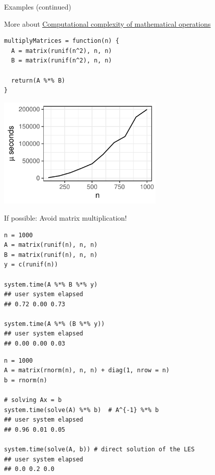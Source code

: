 \documentclass[11pt,compress,t,notes=noshow, xcolor=table]{beamer}
\begin{document}
\begin{vbframe}{Examples (continued)}
\vfill
\begin{footnotesize}
More about \href{https://en.wikipedia.org/wiki/Computational_complexity_of_mathematical_operations}{\color{blue}\underline{Computational complexity of mathematical operations}}
\end{footnotesize}

\framebreak

\begin{verbatim}
multiplyMatrices = function(n) {
  A = matrix(runif(n^2), n, n)
  B = matrix(runif(n^2), n, n)

  return(A %*% B)
}
\end{verbatim}

\vspace{-0.2cm}
\begin{center}
\includegraphics[height = 0.5\textheight, width= 0.6\textwidth]{figure_man/runtime_matmult.pdf}
\end{center}

\framebreak

If possible: Avoid matrix multiplication!
\begin{verbatim}
n = 1000
A = matrix(runif(n), n, n)
B = matrix(runif(n), n, n)
y = c(runif(n))

system.time(A %*% B %*% y)
## user system elapsed 
## 0.72 0.00 0.73

system.time(A %*% (B %*% y))
## user system elapsed 
## 0.00 0.00 0.03
\end{verbatim}

\begin{verbatim}
n = 1000
A = matrix(rnorm(n), n, n) + diag(1, nrow = n)
b = rnorm(n)

# solving Ax = b
system.time(solve(A) %*% b)  # A^{-1} %*% b
## user system elapsed 
## 0.96 0.01 0.05

system.time(solve(A, b)) # direct solution of the LES
## user system elapsed 
## 0.0 0.2 0.0
\end{verbatim}


%
%


\end{vbframe}
\end{document}
